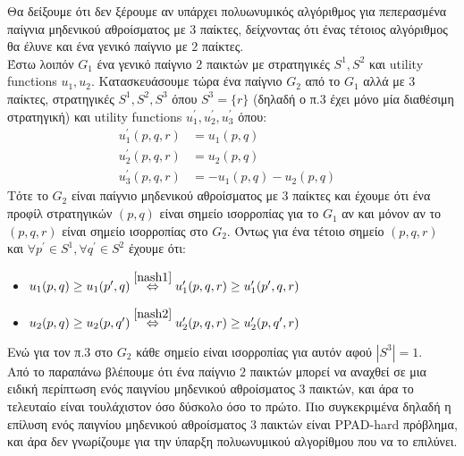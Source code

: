 \documentclass[a4paper,11pt]{article}
\begin{document}
Θα δείξουμε ότι δεν ξέρουμε αν υπάρχει πολυωνυμικός αλγόριθμος για πεπερασμένα παίγνια μηδενικού αθροίσματος με $3$ παίκτες, δείχνοντας ότι ένας τέτοιος αλγόριθμος θα έλυνε και ένα γενικό παίγνιο με $2$ παίκτες.
\\[8pt]
Έστω λοιπόν $G_1$ ένα γενικό παίγνιο $2$ παικτών με στρατηγικές $S^1,S^2$ και utility functions $u_1, u_2$.
Κατασκευάσουμε τώρα ένα παίγνιο $G_2$ από το $G_1$ αλλά με $3$ παίκτες, στρατηγικές $S^1,S^2,S^3$ όπου $S^3 = \{r\}$ (δηλαδή ο π.3 έχει μόνο μία διαθέσιμη στρατηγική) και utility functions $u_1^\prime, u_2^\prime, u_3^\prime$ όπου:
\begin{align}
  u_1^\prime(p,q,r) &= u_1(p,q) \label{nash1}&\\
  u_2^\prime(p,q,r) &= u_2(p,q) \label{nash2}\\
  u_3^\prime(p,q,r) &= -u_1(p,q)-u_2(p,q) \nonumber
\end{align}
Τότε το $G_2$ είναι παίγνιο μηδενικού αθροίσματος με $3$ παίκτες και έχουμε ότι ένα προφίλ στρατηγικών $(p,q)$ είναι σημείο ισορροπίας για το $G_1$ αν και μόνον αν το $(p,q,r)$ είναι σημείο ισορροπίας στο $G_2$.
Όντως για ένα τέτοιο σημείο $(p,q,r)$ και $\forall p^\prime \in S^1, \forall q^\prime \in S^2$ έχουμε ότι:
\begin{itemize}
	\item $u_1(p,q) \geq u_1(p^\prime,q) \stackrel{\eqref{nash1}}{\Leftrightarrow} u_1^\prime(p,q,r) \geq u_1^\prime(p^\prime,q,r)$
	\item $u_2(p,q) \geq u_2(p,q^\prime) \stackrel{\eqref{nash2}}{\Leftrightarrow} u_2^\prime(p,q,r) \geq u_2^\prime(p,q^\prime,r)$
\end{itemize}
Ενώ για τον π.3 στο $G_2$ κάθε σημείο είναι ισορροπίας για αυτόν αφού $|S^3|=1$.
\\[8pt]
Από το παραπάνω βλέπουμε ότι ένα παίγνιο $2$ παικτών μπορεί να αναχθεί σε μια ειδική περίπτωση ενός παιγνίου μηδενικού αθροίσματος $3$ παικτών, και άρα το τελευταίο είναι τουλάχιστον όσο δύσκολο όσο το πρώτο.
Πιο συγκεκριμένα δηλαδή η επίλυση ενός παιγνίου μηδενικού αθροίσματος $3$ παικτών είναι PPAD-hard πρόβλημα, και άρα δεν γνωρίζουμε για την ύπαρξη πολυωνυμικού αλγορίθμου που να το επιλύνει.
\end{document}
